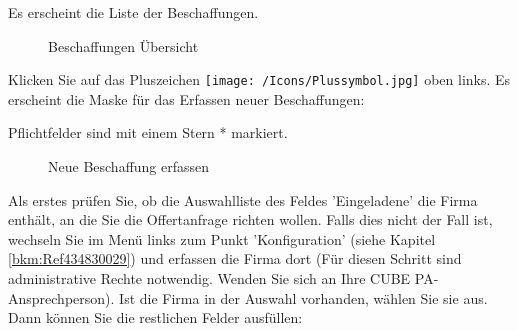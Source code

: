 Es erscheint die Liste der Beschaffungen.

\vspace{2cm}

\begin{figure}[H]
\caption{Beschaffungen Übersicht}
\end{figure}


Klicken Sie auf das Pluszeichen \texttt{[image: /Icons/Plussymbol.jpg]}  oben links. Es erscheint die Maske für das Erfassen neuer Beschaffungen:

\vspace{\baselineskip}

Pflichtfelder sind mit einem Stern * markiert.

\begin{figure}[H]
\caption{Neue Beschaffung erfassen}
\end{figure}

Als erstes prüfen Sie, ob die Auswahlliste des Feldes 'Eingeladene'  die Firma enthält, an die Sie die Offertanfrage richten wollen. Falls dies nicht der Fall ist, wechseln Sie im Menü links zum Punkt 'Konfiguration' (siehe Kapitel \ref{bkm:Ref434830029}) und erfassen die Firma dort (Für diesen Schritt sind administrative Rechte notwendig. Wenden Sie sich an Ihre CUBE PA-Ansprechperson). Ist die Firma in der Auswahl vorhanden, wählen Sie sie aus. Dann können Sie die restlichen Felder ausfüllen:

\vspace{\baselineskip}

